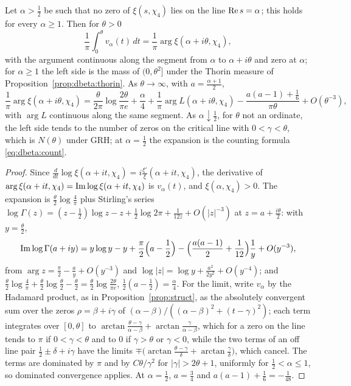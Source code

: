 \begin{proposition}\label{prop:dbeta:arg}
Let $\alpha>\frac12$ be such that no zero of $\xi(s,\chi_4)$ lies on the line $\operatorname{Re} s=\alpha$; this holds for every $\alpha\ge1$. Then for $\theta>0$
\[
\frac1\pi\int_0^\theta v_\alpha(t)\,dt=\frac1\pi\arg\xi(\alpha+i\theta,\chi_4),
\]
with the argument continuous along the segment from $\alpha$ to $\alpha+i\theta$ and zero at $\alpha$; for $\alpha\ge1$ the left side is the mass of $(0,\theta^2]$ under the Thorin measure of Proposition~\ref{prop:dbeta:thorin}. As $\theta\to\infty$, with $a=\frac{\alpha+1}2$,
\[
\frac1\pi\arg\xi(\alpha+i\theta,\chi_4)=\frac\theta{2\pi}\log\frac{2\theta}{\pi e}+\frac\alpha4+\frac1\pi\arg L(\alpha+i\theta,\chi_4)-\frac{a(a-1)+\frac16}{\pi\theta}+O(\theta^{-3}),
\]
with $\arg L$ continuous along the same segment. As $\alpha\downarrow\frac12$, for $\theta$ not an ordinate, the left side tends to the number of zeros on the critical line with $0<\gamma<\theta$, which is $N(\theta)$ under GRH; at $\alpha=\frac12$ the expansion is the counting formula \eqref{eq:dbeta:count}.
\end{proposition}

\begin{proof}
Since $\frac{d}{dt}\log\xi(\alpha+it,\chi_4)=i\frac{\xi'}\xi(\alpha+it,\chi_4)$, the derivative of $\arg\xi(\alpha+it,\chi_4)=\operatorname{Im}\log\xi(\alpha+it,\chi_4)$ is $v_\alpha(t)$, and $\xi(\alpha,\chi_4)>0$. The expansion is $\frac\theta2\log\frac4\pi$ plus Stirling's series $\log\Gamma(z)=(z-\frac12)\log z-z+\frac12\log2\pi+\frac1{12z}+O(|z|^{-3})$ \cite[\S5.11]{DLMF} at $z=a+\frac{i\theta}2$: with $y=\frac\theta2$,
\[
\operatorname{Im}\log\Gamma(a+iy)=y\log y-y+\frac\pi2\Big(a-\frac12\Big)-\Big(\frac{a(a-1)}2+\frac1{12}\Big)\frac1y+O(y^{-3}),
\]
from $\arg z=\frac\pi2-\frac ay+O(y^{-3})$ and $\log|z|=\log y+\frac{a^2}{2y^2}+O(y^{-4})$; and $\frac\theta2\log\frac4\pi+\frac\theta2\log\frac\theta2-\frac\theta2=\frac\theta2\log\frac{2\theta}{\pi e}$, $\frac12(a-\frac12)=\frac\alpha4$. For the limit, write $v_\alpha$ by the Hadamard product, as in Proposition~\ref{prop:struct}, as the absolutely convergent sum over the zeros $\rho=\beta+i\gamma$ of $(\alpha-\beta)/((\alpha-\beta)^2+(t-\gamma)^2)$; each term integrates over $[0,\theta]$ to $\arctan\frac{\theta-\gamma}{\alpha-\beta}+\arctan\frac\gamma{\alpha-\beta}$, which for a zero on the line tends to $\pi$ if $0<\gamma<\theta$ and to $0$ if $\gamma>\theta$ or $\gamma<0$, while the two terms of an off line pair $\frac12\pm\delta+i\gamma$ have the limits $\mp\big(\arctan\frac{\theta-\gamma}\delta+\arctan\frac\gamma\delta\big)$, which cancel. The terms are dominated by $\pi$ and by $C\theta/\gamma^2$ for $|\gamma|>2\theta+1$, uniformly for $\frac12<\alpha\le1$, so dominated convergence applies. At $\alpha=\frac12$, $a=\frac34$ and $a(a-1)+\frac16=-\frac1{48}$.
\end{proof}

